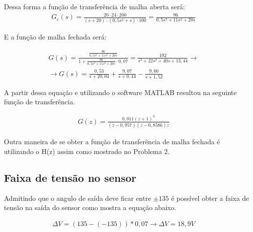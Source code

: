 \documentclass[a4paper,12pt]{article}
\begin{document}
	Dessa forma a função de transferência de malha aberta será:
	\begin{equation}
		\left.
		\begin{array}{c}
			\displaystyle G_{c}(s) = \frac{20 \cdot 24 \cdot 200}{(s+20) \cdot (0,5s^2+s)\cdot 100} = \frac{96}{0,5s^3 + 11s^2 + 20s}
		\end{array}
		\right.
		\quad 
	\end{equation}
	
	E a função de malha fechada será:
	
	\begin{equation}
		\left.
		\begin{array}{c}
			\displaystyle G(s) = \frac{\displaystyle \frac{96}{0,5s^3 + 11s^2 + 20s}}{1 + \displaystyle \frac{96}{0,5s^3 + 11s^2 + 20s} \cdot 0,07} = \frac{192}{s^3 + 22s^2 +40s + 13,44} \rightarrow \\[30pt]
			
			 \rightarrow  \displaystyle G(s) = \frac{0,53}{s+20,04} + \frac{9,07}{s+0,44} - \frac{9,60}{s+1,52}
		\end{array}
		\right.
		\quad 
	\end{equation}
	
	A partir dessa equação e utilizando o software MATLAB resultou na seguinte função de transferência.
	
	\begin{equation}
		\left.
		\begin{array}{c}
			\displaystyle G(z) = \frac{0,011(z+1)^3}{(z-0,957)(z-0,8586)z}
		\end{array}
		\right.
		\quad 
	\end{equation}
	
	Outra maneira de se obter a função de transferência de malha fechada é utilizando o H(z) assim como mostrado no Problema 2.
	
	\subsection{Faixa de tensão no sensor}
		Admitindo que o angulo de saída deve ficar entre $\pm135$ é possível obter a faixa de tensão na saída do sensor como mostra a equação abaixo.
		
		\begin{equation}
			\left.
			\begin{array}{c}
				\displaystyle \Delta V = (135 - (-135)) * 0,07 \rightarrow \Delta V = 18,9V
			\end{array}
			\right.
			\quad 
		\end{equation}
		
\end{document}
